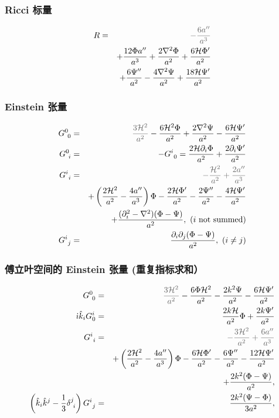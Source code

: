 \documentclass[CJK,13pt]{beamer}
\begin{document}
  \begin{frame}
    \frametitle{Ricci 标量}
    \begin{eqnarray}
      R &=& {\gray - \frac{6 {a''}}{a^3 }} \nonumber \\
      && + \frac{12 \Phi  {a''}}{a^3 } + \frac{2 \nabla^2 \Phi }{a^2 } + \frac{6 \mathcal{H} \Phi' }{a^2 } \nonumber \\
      && + \frac{6\Psi'' }{a^2 } - \frac{4 \nabla^2 \Psi }{a^2 }  + \frac{18\mathcal{H}  \Psi'  }{a^2 }
      \end{eqnarray}
  \end{frame}

  \begin{frame}
    \frametitle{Einstein 张量}
 \begin{eqnarray}
G^{0}_{\ 0} &=& {\gray \frac{3\mathcal{H}^2}{a^2 }} - \frac{6 \mathcal{H}^2  \Phi }{a^2 } + \frac{2 \nabla^2\Psi }{a^2 }  - \frac{6\mathcal{H}\Psi'}{a^2 } \\
G^{0}_{\ i} &=& - G^i_{\ 0} = \frac{2\mathcal{H}  {\partial_i} \Phi   }{a^2 } + \frac{2  {\partial_{i}} \Psi' }{a^2 }  \\
G^{i}_{\ i} &=& {\gray - \frac{\mathcal{H}^2}{a^2} + \frac{2 a''}{a^3 } } \nonumber \\
&& + \left(\frac{2\mathcal{H}^2}{a^2}- \frac{4 a''}{a^3 } \right)\Phi - \frac{2\mathcal{H} \Phi'}{a^2} - \frac{2 \Psi''}{a^2 }- \frac{4\mathcal{H}\Psi'}{a^2 } \nonumber \\
&&  + \frac{(\partial_i^2-\nabla^2) (\Phi-\Psi) }{a^2 } ,\ \text{($i$ not summed)} \\
G^{i}_{\ j} &=&   \frac{ {\partial_i\partial_j} (\Phi-\Psi) }{a^2 } , \ (i\ne j)  \label{eq:shear}
 \end{eqnarray}
\end{frame}

  \begin{frame}
    \frametitle{傅立叶空间的 Einstein 张量 (重复指标求和）}
      {\blue
 \begin{eqnarray}
G^{0}_{\ 0} &=& {\gray \frac{3\mathcal{H}^2}{a^2 }} - \frac{6 \Phi  \mathcal{H}^2}{a^2 } - \frac{2k^2\Psi }{a^2 }  - \frac{6\mathcal{H}\Psi'}{a^2 } \\
\ii\hat{k}_i G^{i}_{0} &=&  \frac{2 k \mathcal{H} }{a^2 }\Phi + \frac{2 k \Psi' }{a^2 }  \\
G^{i}_{\ i} &=&  {\gray - \frac{3\mathcal{H}^2}{a^2} + \frac{6 {a''}}{a^3 } } \nonumber \\
&&  + \left(\frac{2\mathcal{H}^2}{a^2 }- \frac{4 {a''}}{a^3 } \right)\Phi - \frac{6\mathcal{H} \Phi'}{a^2 } - \frac{6 \Psi'' }{a^2 }- \frac{12\mathcal{H} \Psi'}{a^2 } \nonumber \\
&&  + \frac{2k^2 (\Phi-\Psi) }{a^2 } , \\
 \left(\hat{k}_i\hat{k}^j-\frac{1}{3}\delta^j_{\ i}\right)G^i_{\ j} &=&  \frac{2k^2(\Psi-\Phi)}{3a^2 } ,
 \end{eqnarray}}
  \end{frame}
\end{document}
